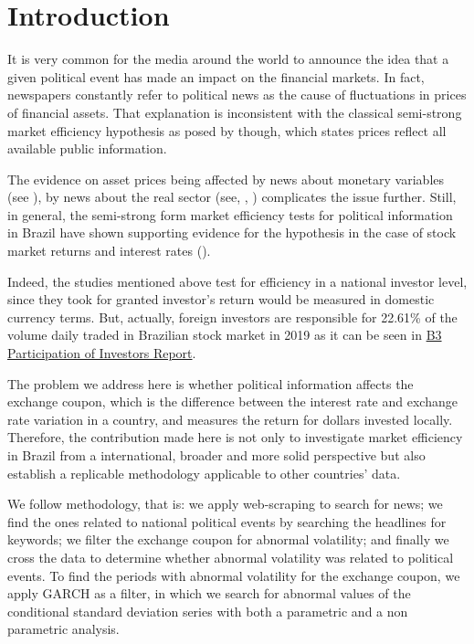 \documentclass[cic,tc, english]{iiufrgs}
\begin{document}
\tableofcontents


\chapter{Introduction} \label{chapter_introduction}

    It is very common for the media around the world to announce the idea that a given political event has made an impact on the financial markets. In fact, newspapers constantly refer to political news as the cause of fluctuations in prices of financial assets. That explanation is inconsistent with the classical semi-strong market efficiency hypothesis as posed by \citet{fama1970} though, which states prices reflect all available public information.  
    
    The evidence on asset prices being affected by news about monetary variables (see \citet{cornell1983}), by news about the real sector (see, \citet{macqueenroley1993}, \citet{caporaleetal2015}) complicates the issue further. Still, in general, the semi-strong form market efficiency tests for political information in Brazil have shown supporting evidence for the hypothesis in the case of stock market returns and interest rates (\citet{marquessantos2016}).
    
    Indeed, the studies mentioned above test for efficiency in a national investor level, since they took for granted investor's return would be measured in domestic currency terms.  But, actually, foreign investors are responsible for 22.61\% of the volume daily traded in Brazilian stock market in 2019 as it can be seen in  \href{http://www.b3.com.br/data/files/14/B4/D5/25/4B80B61070D79EA6AC094EA8/partdir_NOVOv2.xls}{B3 Participation of Investors Report}.
    
    The problem we address here is whether political information affects the exchange coupon, which is the difference between the interest rate and exchange rate variation in a country, and measures the return for dollars invested locally. Therefore, the contribution made here is not only to investigate market efficiency in Brazil from a international, broader and more solid perspective but also establish a replicable methodology applicable to other countries' data.
    
    We follow \citet{marquessantos2016} methodology, that is: we apply web-scraping to search for news; we find the ones related to national political events by searching the headlines for keywords; we filter the exchange coupon for abnormal volatility; and finally we cross the data to determine whether abnormal volatility was related to political events. To find the periods with abnormal volatility for the exchange coupon, we apply \citet{bollerslev1986} GARCH as a filter, in which we search for abnormal values of the conditional standard deviation series with both a parametric and a non parametric analysis.
\end{document}
